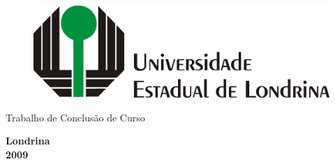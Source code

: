 \thispagestyle{empty}

\begin{figure}[htb]
    \begin{center}
        \includegraphics[scale=0.9]{./figuras/p-modelo1.jpg}
    \end{center}
\end{figure}

\begin{center}
    Trabalho de Conclusão de Curso

\end{center}


\begin{center}
\end{center}



\begin{center}
    \bf{Londrina \\ 2009}
\end{center}